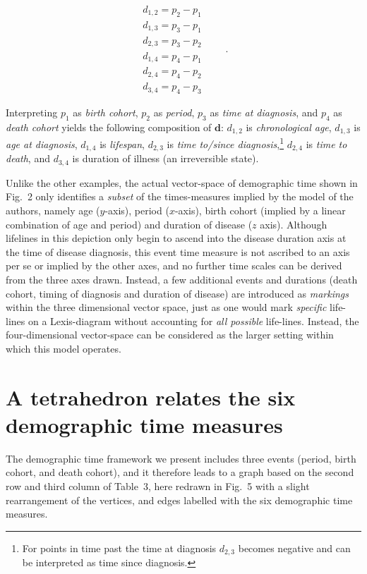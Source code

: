\documentclass{bmcart}
\theoremstyle{definition}
\begin{document}
\begin{equation}
\label{eq:p4}
\begin{matrix}
d_{1,2} = p_2 - p_1\\
d_{1,3} = p_3 - p_1\\
d_{2,3} = p_3 - p_2\\
d_{1,4} = p_4 - p_1\\
d_{2,4} = p_4 - p_2\\
d_{3,4} = p_4 - p_3
\end{matrix} \quad\quad.
\end{equation}

Interpreting $p_1$ as \textit{birth cohort}, $p_2$ as \textit{period}, $p_3$ as
\textit{time at diagnosis}, and $p_4$ as \textit{death cohort} yields the following composition
of $\boldsymbol{d}$: $d_{1,2}$ is \textit{chronological age}, $d_{1,3}$ is
\textit{age at diagnosis}, $d_{1,4}$ is \textit{lifespan}, $d_{2,3}$ is
\textit{time to/since diagnosis},\footnote{For points
in time past the time at diagnosis $d_{2,3}$ becomes negative and can be
interpreted as time since diagnosis.} $d_{2,4}$ is \textit{time to
death}, and $d_{3,4}$ is duration of illness (an irreversible state).

Unlike the other examples, the actual vector-space of demographic
time shown in \citet{brinks2014lexis} Fig.~2 only identifies a
\emph{subset} of the times-measures implied by the model of the
authors, namely age ($y$-axis), period ($x$-axis), birth cohort (implied by a
linear combination of age and period) and duration of disease ($z$ axis).
Although lifelines in this depiction only begin to ascend into the disease
duration axis at the time of disease diagnosis, this event time measure is not
ascribed to an axis per se or implied by the other axes, and no further time
scales can be derived from the three axes drawn.
Instead, a few additional events and durations (death cohort, timing of
diagnosis and duration of disease) are introduced as \emph{markings} within the three
dimensional vector space, just as one would mark \emph{specific} life-lines on
a Lexis-diagram without accounting for \emph{all possible} life-lines.
Instead, the four-dimensional vector-space can be considered as the larger
setting within which this model operates.


\FloatBarrier
\section{A tetrahedron relates the six demographic time measures}
\label{sec:tetrahedron}
The demographic time framework we present includes three events (period, birth
cohort, and death cohort), and it therefore leads to a graph
based on the second row and third column of Table~3, here
redrawn in Fig.~5 with a slight rearrangement of the
vertices, and edges labelled with the six demographic time measures.
\end{document}
